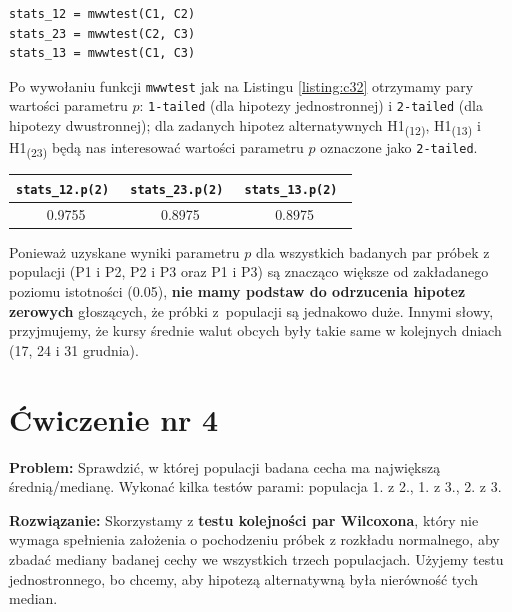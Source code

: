 \documentclass[12pt, a4paper]{article}
\begin{document}
\begin{lstlisting}[frame=single,label={listing:c32},caption={badanie, czy wartości próbek z populacji są jednakowo duże.},captionpos=b]
stats_12 = mwwtest(C1, C2)
stats_23 = mwwtest(C2, C3)
stats_13 = mwwtest(C1, C3)
\end{lstlisting}

Po wywołaniu funkcji \texttt{mwwtest} jak na Listingu \ref{listing:c32} otrzymamy pary wartości parametru $p$: \texttt{1-tailed} (dla hipotezy jednostronnej) i \texttt{2-tailed} (dla hipotezy dwustronnej); dla zadanych hipotez alternatywnych H1\textsubscript{(12)}, H1\textsubscript{(13)} i H1\textsubscript{(23)} będą nas interesować wartości parametru $p$ oznaczone jako \texttt{2-tailed}.

\begin{center}
  \begin{tabular}{|c|c|c|}\hline
    \tt stats\_12.p(2) & \tt stats\_23.p(2) & \tt stats\_13.p(2) \\\hline
    0.9755 & 0.8975 & 0.8975 \\\hline
  \end{tabular}
  \label{table:c32}
\end{center}

Ponieważ uzyskane wyniki parametru $p$ dla wszystkich badanych par próbek z populacji (P1 i P2, P2 i P3 oraz P1 i P3) są znacząco większe od zakładanego poziomu istotności (0.05), \textbf{nie mamy podstaw do odrzucenia hipotez zerowych} głoszących, że próbki z~populacji są jednakowo duże. Innymi słowy, przyjmujemy, że kursy średnie walut obcych były takie same w kolejnych dniach (17, 24 i 31 grudnia).

\section*{Ćwiczenie nr 4}
\begin{hangparas}{2cm}{1}
  \textbf{Problem:} Sprawdzić, w której populacji badana cecha ma największą średnią/medianę. Wykonać kilka testów parami: populacja 1. z 2., 1. z 3., 2. z 3.\newline
\end{hangparas}

\begin{hangparas}{2.85cm}{1}
\textbf{Rozwiązanie:} Skorzystamy z \textbf{testu kolejności par Wilcoxona}, który nie wymaga spełnienia założenia o pochodzeniu próbek z rozkładu normalnego, aby zbadać mediany badanej cechy we wszystkich trzech populacjach. Użyjemy testu jednostronnego, bo chcemy, aby hipotezą alternatywną była nierówność tych median.\newline
\end{hangparas}
\end{document}
